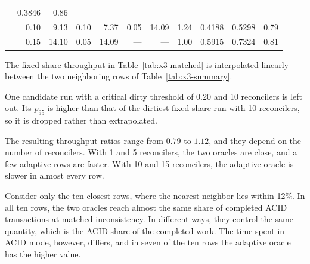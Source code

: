 \begin{table}[!htbp]
\begin{tabular}{r r r r r r r c r r c}
                                                        & 0.3846   & 0.86
    \\
                                                        & 0.10     & 9.13                &
    0.10                                                &
    7.37                                                & 0.05     & 14.09
                                                        & 1.24     & 0.4188
                                                        & 0.5298   & 0.79
    \\
                                                        & 0.15     & 14.10               &
    0.05                                                &
    14.09                                               & ---      & ---
                                                        & 1.00     & 0.5915
                                                        & 0.7324   & 0.81
    \\
    \bottomrule
  \end{tabular}
\end{table}

The fixed-share throughput in Table~\ref{tab:x3-matched} is interpolated linearly between
the two neighboring rows of Table~\ref{tab:x3-summary}.

One candidate run with a critical dirty threshold of
0.20 and 10 reconcilers is left out. Its $p_{95}$ is higher than that of the dirtiest fixed-share
run with 10 reconcilers, so it is dropped rather than extrapolated.

The resulting throughput ratios range from $0.79$ to $1.12$, and they
depend on the number of reconcilers. With 1 and 5 reconcilers, the two oracles
are close, and a few adaptive rows are faster. With 10 and 15 reconcilers, the adaptive oracle is slower in almost
every row.

Consider only the ten closest rows, where the nearest
neighbor lies within 12\%. In all ten rows, the two oracles reach almost the same share of
completed ACID transactions at matched inconsistency. In different ways, they control the same
quantity, which is the ACID share of the completed work. The time spent in ACID mode, however,
differs, and in seven of the ten rows the adaptive oracle has the higher value.

